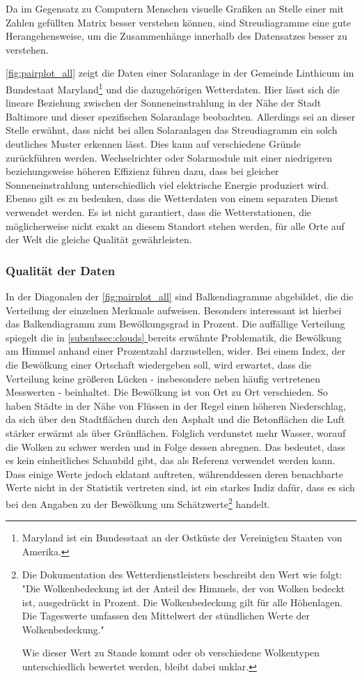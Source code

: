 \documentclass[12pt, a4paper]{article}
\newcommand*{\fullref}[1]{\hyperref[{#1}]{\autoref*{#1} \textit{\nameref*{#1}}}}
\begin{document}
Da im Gegensatz zu Computern Menschen visuelle Grafiken an Stelle einer mit Zahlen gefüllten Matrix besser verstehen können, sind Streudiagramme eine gute Herangehensweise, um die Zusammenhänge innerhalb des Datensatzes besser zu verstehen.

\autoref{fig:pairplot_all} zeigt die Daten einer Solaranlage in der Gemeinde Linthicum im Bundestaat Maryland\footnote{Maryland ist ein Bundesstaat an der Ostküste der Vereinigten Staaten von Amerika.} und die dazugehörigen Wetterdaten. Hier lässt sich die lineare Beziehung zwischen der Sonneneinstrahlung in der Nähe der Stadt Baltimore und dieser spezifischen Solaranlage beobachten. Allerdings sei an dieser Stelle erwähnt, dass nicht bei allen Solaranlagen das Streudiagramm ein solch deutliches Muster erkennen lässt. Dies kann auf verschiedene Gründe zurückführen werden. Wechselrichter oder Solarmodule mit einer niedrigeren beziehungsweise höheren Effizienz führen dazu, dass bei gleicher Sonneneinstrahlung unterschiedlich viel elektrische Energie produziert wird. Ebenso gilt es zu bedenken, dass die Wetterdaten von einem separaten Dienst verwendet werden. Es ist nicht garantiert, dass die Wetterstationen, die möglicherweise nicht exakt an diesem Standort stehen werden, für alle Orte auf der Welt die gleiche Qualität gewährleisten.

\subsubsection{Qualität der Daten}
\label{subsubsec:quality_data}

In der Diagonalen der \autoref{fig:pairplot_all} sind Balkendiagramme abgebildet, die die Verteilung der einzelnen Merkmale aufweisen. Besonders interessant ist hierbei das Balkendiagramm zum Bewölkungsgrad in Prozent. Die auffällige Verteilung spiegelt die in \fullref{subsubsec:clouds} bereits erwähnte Problematik, die Bewölkung am Himmel anhand einer Prozentzahl darzustellen, wider. Bei einem Index, der die Bewölkung einer Ortschaft wiedergeben soll, wird erwartet, dass die Verteilung keine größeren Lücken - insbesondere neben häufig vertretenen Messwerten - beinhaltet. Die Bewölkung ist von Ort zu Ort verschieden. So haben Städte in der Nähe von Flüssen in der Regel einen höheren Niederschlag, da sich über den Stadtflächen durch den Asphalt und die Betonflächen die Luft stärker erwärmt als über Grünflächen. Folglich verdunstet mehr Wasser, worauf die Wolken zu schwer werden und in Folge dessen abregnen. Das bedeutet, dass es kein einheitliches Schaubild gibt, das als Referenz verwendet werden kann. Dass einige Werte jedoch eklatant auftreten, währenddessen deren benachbarte Werte nicht in der Statistik vertreten sind, ist ein starkes Indiz dafür, dass es sich bei den Angaben zu der Bewölkung um Schätzwerte\footnote{Die Dokumentation des Wetterdienstleisters beschreibt den Wert wie folgt: "Die Wolkenbedeckung ist der Anteil des Himmels, der von Wolken bedeckt ist, ausgedrückt in Prozent. Die Wolkenbedeckung gilt für alle Höhenlagen. Die Tageswerte umfassen den Mittelwert der stündlichen Werte der Wolkenbedeckung."

Wie dieser Wert zu Stande kommt oder ob verschiedene Wolkentypen unterschiedlich bewertet werden, bleibt dabei unklar.} handelt.
\end{document}
